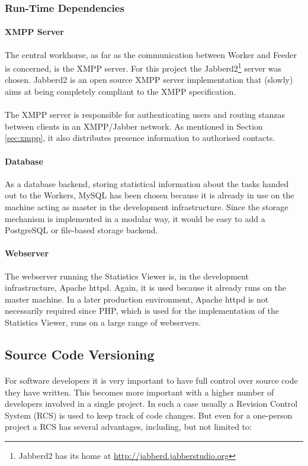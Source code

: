 \subsubsection{Run-Time Dependencies}
\paragraph{XMPP Server}
The central workhorse, as far as the communication between Worker and Feeder is concerned, is the XMPP server. For this project the Jabberd2\footnote{Jabberd2 has its home at \href{http://jabberd.jabberstudio.org}{http://jabberd.jabberstudio.org}} server was chosen. Jabberd2 is an open source XMPP server implementation that (slowly) aims at being completely compliant to the XMPP specification.
\paragraph{}
The XMPP server is responsible for authenticating users and routing stanzas between clients in an XMPP/Jabber network. As mentioned in Section \ref{sec:xmpp}, it also distributes presence information to authorised contacts.

\paragraph{Database}
As a database backend, storing statistical information about the tasks handed out to the Workers, MySQL has been chosen because it is already in use on the machine acting as master in the development infrastructure. Since the storage mechanism is implemented in a modular way, it would be easy to add a PostgreSQL or file-based storage backend.

\paragraph{Webserver}
The webserver running the Statistics Viewer is, in the development infrastructure, Apache httpd. Again, it is used because it already runs on the master machine. In a later production environment, Apache httpd is not necessarily required since PHP, which is used for the implementation of the Statistics Viewer, runs on a large range of webservers.


\subsection{Source Code Versioning}
\paragraph{}
For software developers it is very important to have full control over source code they have written. This becomes more important with a higher number of developers involved in a single project. In such a case usually a Revision Control System (RCS) is used to keep track of code changes. But even for a one-person project a RCS has several advantages, including, but not limited to:

